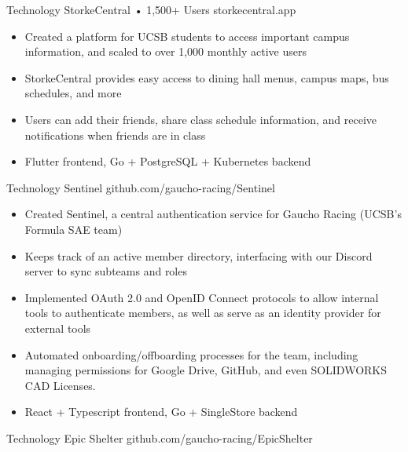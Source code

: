 \documentclass[9pt]{developercv} %
\begin{document}
\begin{entrylist}
    \entry
		{Technology}
		{StorkeCentral • 1,500+ Users}
		{storkecentral.app}
        {\vspace{-8pt}
        \begin{itemize}[noitemsep,topsep=0pt,parsep=0pt,partopsep=0pt, leftmargin=10pt]
            \item Created a platform for UCSB students to access important campus information, and scaled to over 1,000 monthly active users
            \item StorkeCentral provides easy access to dining hall menus, campus maps, bus schedules, and more
            \item Users can add their friends, share class schedule information, and receive notifications when friends are in class
            \item Flutter frontend, Go + PostgreSQL + Kubernetes backend
        \end{itemize}}
	\entry
		{Technology}
		{Sentinel}
		{github.com/gaucho-racing/Sentinel}
		{\vspace{-8pt}
        \begin{itemize}[noitemsep,topsep=0pt,parsep=0pt,partopsep=0pt, leftmargin=10pt]
            \item Created Sentinel, a central authentication service for Gaucho Racing (UCSB's Formula SAE team)
            \item Keeps track of an active member directory, interfacing with our Discord server to sync subteams and roles
            \item Implemented OAuth 2.0 and OpenID Connect protocols to allow internal tools to authenticate members, as well as serve as an identity provider for external tools
            \item Automated onboarding/offboarding processes for the team, including managing permissions for Google Drive, GitHub, and even SOLIDWORKS CAD Licenses.
            \item React + Typescript frontend, Go + SingleStore backend
        \end{itemize}}
    \entry
		{Technology}
		{Epic Shelter}
		{github.com/gaucho-racing/EpicShelter}
		{\vspace{-8pt}
        \begin{itemize}[noitemsep,topsep=0pt,parsep=0pt,partopsep=0pt, leftmargin=10pt]

\end{itemize}}
\end{entrylist}
\end{document}
